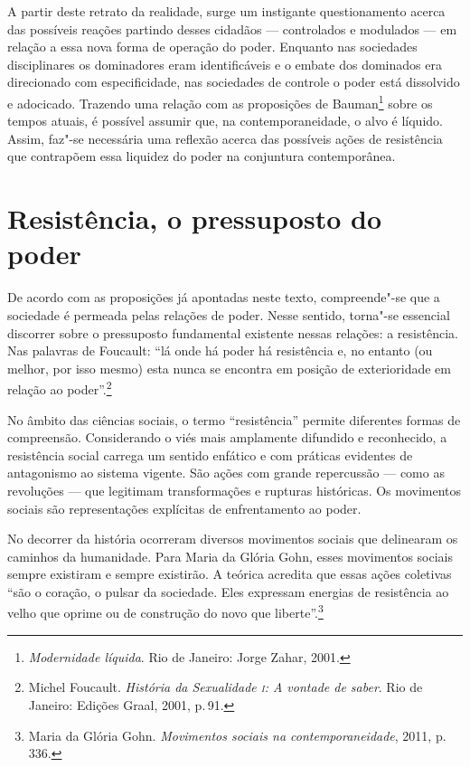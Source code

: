 A partir deste retrato da realidade, surge um instigante questionamento
acerca das possíveis reações partindo desses cidadãos --- controlados e
modulados --- em relação a essa nova forma de operação do poder. Enquanto
nas sociedades disciplinares os dominadores eram identificáveis e o
embate dos dominados era direcionado com especificidade, nas sociedades
de controle o poder está dissolvido e adocicado. Trazendo uma relação
com as proposições de Bauman\footnote{\emph{Modernidade líquida}. Rio de Janeiro: Jorge Zahar, 2001.} sobre os tempos atuais, é possível
assumir que, na contemporaneidade, o alvo é líquido. Assim, faz"-se
necessária uma reflexão acerca das possíveis ações de resistência que
contrapõem essa liquidez do poder na conjuntura contemporânea.

\section{Resistência, o pressuposto do poder}

De acordo com as proposições já apontadas neste texto, compreende"-se que
a sociedade é permeada pelas relações de poder. Nesse sentido, torna"-se
essencial discorrer sobre o pressuposto fundamental existente nessas
relações: a resistência. Nas palavras de Foucault: ``lá onde há poder há
resistência e, no entanto (ou melhor, por isso mesmo) esta nunca se
encontra em posição de exterioridade em relação ao poder''.\footnote{Michel Foucault. \emph{História da Sexualidade \textsc{i}: A vontade de saber}. Rio de Janeiro: Edições Graal, 2001, p.\,91.}

No âmbito das ciências sociais, o termo ``resistência'' permite
diferentes formas de compreensão. Considerando o viés mais amplamente
difundido e reconhecido, a resistência social carrega um sentido
enfático e com práticas evidentes de antagonismo ao sistema vigente. São
ações com grande repercussão --- como as revoluções --- que legitimam
transformações e rupturas históricas. Os movimentos sociais são
representações explícitas de enfrentamento ao poder.

No decorrer da história ocorreram diversos movimentos sociais que
delinearam os caminhos da humanidade. Para Maria da Glória Gohn,
esses movimentos sociais sempre existiram e sempre existirão. A teórica
acredita que essas ações coletivas ``são o coração, o pulsar da
sociedade. Eles expressam energias de resistência ao velho que oprime ou
de construção do novo que liberte''.\footnote{Maria da Glória Gohn. \emph{Movimentos sociais na contemporaneidade}, 2011, p.\,336.}

